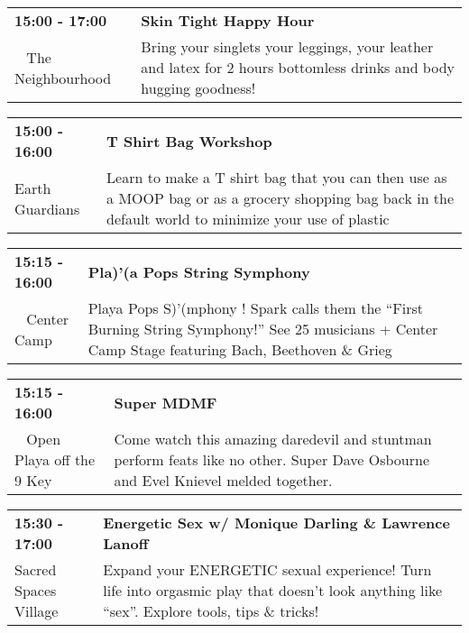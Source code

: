 \begin{tabular}{ p{1in} p{2.2in} }
    \textbf{15:00 - 17:00} & \textbf{Skin Tight Happy Hour} \\
    ~ \newline The Neighbourhood & Bring your singlets your leggings, your leather and latex for 2 hours bottomless drinks and body hugging goodness! \\
    \hline 
\end{tabular}
    
\begin{tabular}{ p{1in} p{2.2in} }
    \textbf{15:00 - 16:00} & \textbf{T Shirt Bag Workshop } \\
    Earth Guardians \newline  & Learn to make a T shirt bag that you can then use as a MOOP bag or as a grocery shopping bag back in the default world to minimize your use of plastic \\
    \hline 
\end{tabular}
    
\begin{tabular}{ p{1in} p{2.2in} }
    \textbf{15:15 - 16:00} & \textbf{Pla)'(a Pops String Symphony} \\
    ~ \newline Center Camp & Playa Pops S)'(mphony ! Spark calls them the ``First Burning String Symphony!'' See 25 musicians + Center Camp Stage featuring Bach, Beethoven \& Grieg \\
    \hline 
\end{tabular}
    
\begin{tabular}{ p{1in} p{2.2in} }
    \textbf{15:15 - 16:00} & \textbf{Super MDMF} \\
    ~ \newline Open Playa off the 9 Key & Come watch this amazing daredevil and stuntman perform feats like no other.  Super Dave Osbourne and Evel Knievel melded together. \\
    \hline 
\end{tabular}
    
\begin{tabular}{ p{1in} p{2.2in} }
    \textbf{15:30 - 17:00} & \textbf{Energetic Sex w/ Monique Darling \& Lawrence Lanoff} \\
    Sacred Spaces Village \newline  & Expand your ENERGETIC sexual experience! Turn life into orgasmic play that doesn't look anything like ``sex''. Explore tools, tips \& tricks! \\
    \hline 
\end{tabular}
    
